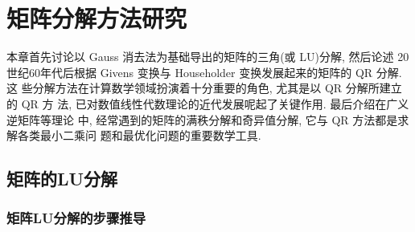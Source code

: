 \section{矩阵分解方法研究}

本章首先讨论以 Gauss 消去法为基础导出的矩阵的三角(或 LU)分解, 然后论述
20世纪60年代后根据 Givens 变换与 Householder 变换发展起来的矩阵的 QR 分解. 这
些分解方法在计算数学领域扮演着十分重要的角色, 尤其是以 QR 分解所建立的 QR 方
法, 已对数值线性代数理论的近代发展呢起了关键作用. 最后介绍在广义逆矩阵等理论
中, 经常遇到的矩阵的满秩分解和奇异值分解, 它与 QR 方法都是求解各类最小二乘问
题和最优化问题的重要数学工具.

\subsection{矩阵的LU分解}

\subsubsection{矩阵LU分解的步骤推导}

